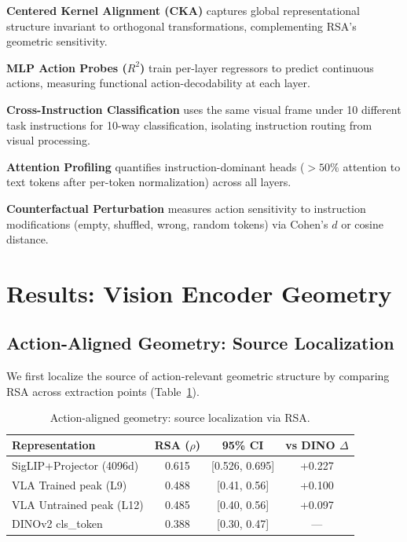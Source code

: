\documentclass[10pt,twocolumn]{article}
\begin{document}
\textbf{Centered Kernel Alignment (CKA)} captures global representational structure invariant to orthogonal transformations, complementing RSA's geometric sensitivity.

\textbf{MLP Action Probes ($R^2$)} train per-layer regressors to predict continuous actions, measuring functional action-decodability at each layer.

\textbf{Cross-Instruction Classification} uses the same visual frame under 10 different task instructions for 10-way classification, isolating instruction routing from visual processing.

\textbf{Attention Profiling} quantifies instruction-dominant heads (${>}50\%$ attention to text tokens after per-token normalization) across all layers.

\textbf{Counterfactual Perturbation} measures action sensitivity to instruction modifications (empty, shuffled, wrong, random tokens) via Cohen's $d$ or cosine distance.


\section{Results: Vision Encoder Geometry}
\label{sec:vision}

\subsection{Action-Aligned Geometry: Source Localization}
\label{sec:source}

We first localize the source of action-relevant geometric structure by comparing RSA across extraction points (Table~\ref{tab:source}).

\begin{table}[t]
\centering
\caption{Action-aligned geometry: source localization via RSA.}
\label{tab:source}
\small
\begin{tabular}{lccc}
\toprule
Representation & RSA ($\rho$) & 95\% CI & vs DINO $\Delta$ \\
\midrule
SigLIP+Projector (4096d) & 0.615 & [0.526, 0.695] & +0.227 \\
VLA Trained peak (L9) & 0.488 & [0.41, 0.56] & +0.100 \\
VLA Untrained peak (L12) & 0.485 & [0.40, 0.56] & +0.097 \\
DINOv2 cls\_token & 0.388 & [0.30, 0.47] & --- \\
\bottomrule
\end{tabular}
\end{table}
\end{document}
